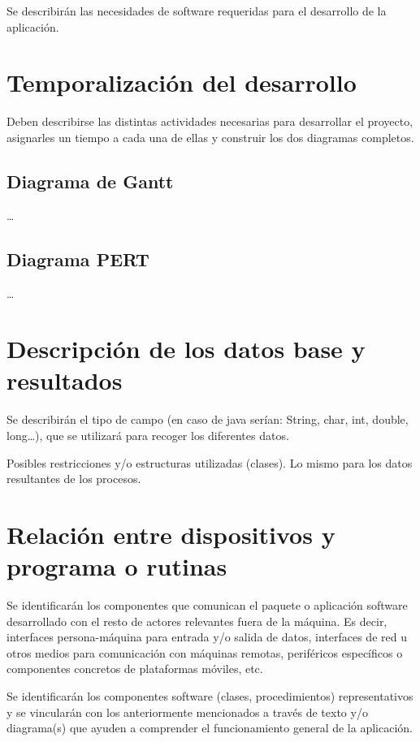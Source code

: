 \documentclass[12pt,a4paper,titlepage]{article}
\begin{document}
    Se describirán las necesidades de software requeridas para el desarrollo de la aplicación.

    \section{Temporalización del desarrollo}

    Deben describirse las distintas actividades necesarias para desarrollar el proyecto, asignarles un tiempo a cada una de ellas y construir los dos diagramas completos.

    \subsection{Diagrama de Gantt}

    \dots

    \subsection{Diagrama PERT}

    \dots

    \section{Descripción de los datos base y resultados}

    Se describirán el tipo de campo (en caso de java serían: String, char, int, double, long\dots), que se utilizará para recoger los diferentes datos.

    Posibles restricciones y/o estructuras utilizadas (clases). Lo mismo para los datos resultantes de los procesos.

    \section{Relación entre dispositivos y programa o rutinas}

    Se identificarán los componentes que comunican el paquete o aplicación software desarrollado con el resto de actores relevantes fuera de la máquina. Es decir, interfaces persona-máquina para entrada y/o salida de datos, interfaces de red u otros medios para comunicación con máquinas remotas, periféricos específicos o componentes concretos de plataformas móviles, etc.

    Se identificarán los componentes software (clases, procedimientos) representativos y se vincularán con los anteriormente mencionados a través de texto y/o diagrama(s) que ayuden a comprender el funcionamiento general de la aplicación.

    

    \newpage

    \printbibliography
    \newpage

    \lstlistoflistings
\end{document}
